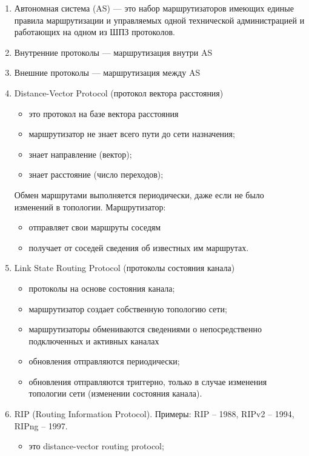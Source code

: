 \begin{enumerate}
    \item Автономная система (AS) --- это набор маршрутизаторов имеющих
    единые правила маршрутизации и управляемых одной технической
    администрацией и работающих на одном из ШПЗ протоколов.
    \item Внутренние протоколы --- маршрутизация внутри AS
    \item Внешние протоколы --- маршрутизация между AS
    \item Distance-Vector Protocol (протокол вектора расстояния)
    \begin{itemize}
        \item это протокол на базе вектора расстояния
        \item маршрутизатор не знает всего пути до сети назначения;
        \item знает направление (вектор);
        \item знает расстояние (число переходов);
    \end{itemize}
    Обмен маршрутами выполняется периодически,
    даже если не было изменений в топологии. Маршрутизатор:
    \begin{itemize}
        \item отправляет свои маршруты соседям
        \item получает от соседей сведения об известных им маршрутах.
    \end{itemize}
    \item Link State Routing Protocol (протоколы состояния канала)
    \begin{itemize}
        \item протоколы на основе состояния канала;
        \item маршрутизатор создает собственную топологию сети;
        \item маршрутизаторы обмениваются сведениями
        о непосредственно подключенных и активных каналах
        \item обновления отправляются периодически;
        \item обновления отправляются триггерно,
        только в случае изменения топологии сети
        (изменении состояния канала).
    \end{itemize}
    \item RIP (Routing Information Protocol).
    Примеры: RIP – 1988, RIPv2 – 1994, RIPng – 1997.
    \begin{itemize}
        \item это distance-vector routing protocol;

\end{itemize}
\end{enumerate}
